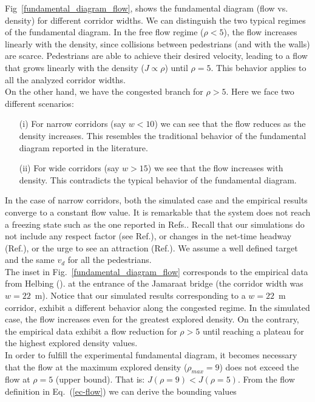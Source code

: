 \documentclass[preprint,12pt]{elsarticle}
\begin{document}
Fig~\ref{fundamental_diagram_flow}, shows the fundamental diagram (flow vs. density) for different corridor widths. We can distinguish the two typical regimes of the fundamental diagram. In the free flow regime ($\rho < 5$), the flow increases linearly with the density, since collisions between pedestrians (and with the walls) are scarce. Pedestrians are able to achieve their desired velocity, leading to a flow that grows linearly with the density ($J \propto \rho$) until $\rho=5$. This behavior applies to all the analyzed corridor widths.\\

On the other hand, we have the congested branch  for $\rho > 5$. Here we face two different scenarios:

\begin{itemize}
\item[(i)] For narrow corridors (say $w < 10$) we can see that the flow reduces as the density increases. This resembles the traditional behavior of the fundamental diagram reported in the literature. 
\item[(ii)] For wide corridors (say $w > 15$) we see that the flow increases with density. This contradicts the typical behavior of the fundamental diagram.   
\end{itemize}

In the case of narrow corridors, both the simulated case and the empirical results converge to a constant flow value. It is remarkable that the system does not reach a freezing state such as the one reported in Refs.\cite{kwak,lin}. Recall that our simulations do not include any respect factor (see Ref.\cite{parisi2}), or changes in the net-time headway (Ref.\cite{helbing3}), or the urge to see an attraction (Ref.\cite{kwak}). We assume a well defined target and the same $v_d$ for all the pedestrians.\\

The inset in Fig.~\ref{fundamental_diagram_flow} corresponds to the empirical data from Helbing (\cite{helbing3}). at the entrance of the Jamaraat bridge (the corridor width was $w=22$~m). Notice that our simulated results corresponding to a $w=22$~m corridor, exhibit a different behavior along the congested regime. In the simulated case, the flow increases even for the greatest explored density. On the contrary, the empirical data exhibit a flow reduction for $\rho > 5$ until reaching a plateau for the highest explored density values.  \\

In order to fulfill the experimental fundamental diagram, it becomes necessary that the flow at the maximum explored density ($\rho_{max} = 9$) does not exceed the flow at $\rho = 5$ (upper bound). That is:  $J(\rho = 9) < J(\rho = 5)$. From the flow definition in Eq.~(\ref{ec-flow}) we can derive the bounding values
\end{document}
